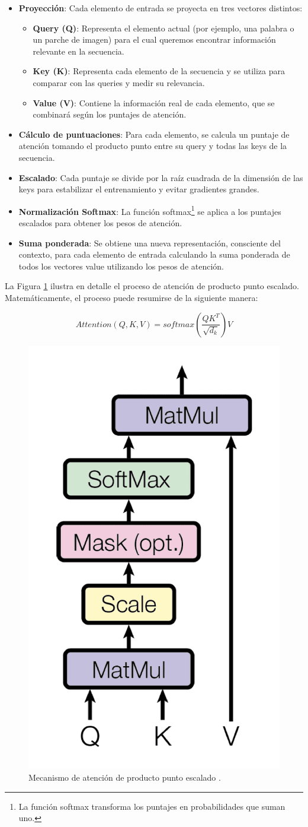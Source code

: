 \documentclass[a4paper,10pt]{book}
\begin{document}
\begin{itemize}
\item \textbf{Proyección}: Cada elemento de entrada se proyecta en tres vectores distintos:
\begin{itemize}
\item \textbf{Query (Q)}: Representa el elemento actual (por ejemplo, una palabra o un parche de imagen) para el cual queremos encontrar información relevante en la secuencia.
\item \textbf{Key (K)}: Representa cada elemento de la secuencia y se utiliza para comparar con las queries y medir su relevancia.
\item \textbf{Value (V)}: Contiene la información real de cada elemento, que se combinará según los puntajes de atención.
\end{itemize}
\item \textbf{Cálculo de puntuaciones}: Para cada elemento, se calcula un puntaje de atención tomando el producto punto entre su query y todas las keys de la secuencia.
\item \textbf{Escalado}: Cada puntaje se divide por la raíz cuadrada de la dimensión de las keys para estabilizar el entrenamiento y evitar gradientes grandes.
\item \textbf{Normalización Softmax}: La función softmax\footnote{La función softmax transforma los puntajes en probabilidades que suman uno.} se aplica a los puntajes escalados para obtener los pesos de atención.
\item \textbf{Suma ponderada}: Se obtiene una nueva representación, consciente del contexto, para cada elemento de entrada calculando la suma ponderada de todos los vectores value utilizando los pesos de atención.
\end{itemize}

La Figura \ref{fig:scaled_dot_product_attn} ilustra en detalle el proceso de atención de producto punto escalado. Matemáticamente, el proceso puede resumirse de la siguiente manera:

$$Attention(Q,K,V) = softmax\left(\frac{QK^T}{\sqrt{d_k}}\right)V$$

\begin{figure}[h!]
\centering
\includegraphics[width=0.3\linewidth]{reports//assets/scaled_dot_product.png}
\caption[Scaled dot-product attention]{Mecanismo de atención de producto punto escalado \cite{vaswani_attention_2017}.}
\label{fig:scaled_dot_product_attn}
\end{figure}
\end{document}
